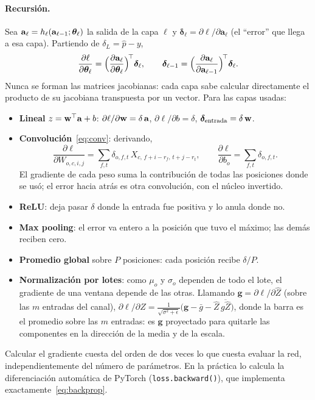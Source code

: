 \paragraph{Recursión.} Sea $\mathbf{a}_\ell = h_\ell(\mathbf{a}_{\ell-1}; \boldsymbol{\theta}_\ell)$ la salida de la capa $\ell$ y
$\boldsymbol\delta_\ell = \partial\ell/\partial\mathbf{a}_\ell$ (el ``error'' que llega a esa capa). Partiendo de
$\delta_L = \hat p - y$,
\begin{equation}
  \frac{\partial\ell}{\partial\boldsymbol{\theta}_\ell} = \Big(\frac{\partial\mathbf{a}_\ell}{\partial\boldsymbol{\theta}_\ell}\Big)^{\!\top}\boldsymbol\delta_\ell,
  \qquad
  \boldsymbol\delta_{\ell-1} = \Big(\frac{\partial\mathbf{a}_\ell}{\partial\mathbf{a}_{\ell-1}}\Big)^{\!\top}\boldsymbol\delta_\ell.
  \label{eq:backprop}
\end{equation}
Nunca se forman las matrices jacobianas: cada capa sabe calcular directamente el producto de su jacobiana transpuesta por un
vector. Para las capas usadas:
\begin{itemize}
  \item \textbf{Lineal} $z = \mathbf{w}^\top\mathbf{a} + b$: $\partial\ell/\partial\mathbf{w} = \delta\,\mathbf{a}$, $\partial\ell/\partial b = \delta$,
        $\boldsymbol\delta_\text{entrada} = \delta\,\mathbf{w}$.
  \item \textbf{Convolución}~\eqref{eq:conv}: derivando,
        \[
          \frac{\partial\ell}{\partial W_{o,c,i,j}} = \sum_{f,t}\delta_{o,f,t}\,X_{c,\,f+i-r_f,\,t+j-r_t},
          \qquad
          \frac{\partial\ell}{\partial b_o} = \sum_{f,t}\delta_{o,f,t}.
        \]
        El gradiente de cada peso suma la contribución de todas las posiciones donde se usó; el error hacia atrás es
        otra convolución, con el núcleo invertido.
  \item \textbf{ReLU}: deja pasar $\delta$ donde la entrada fue positiva y lo anula donde no.
  \item \textbf{Max pooling}: el error va entero a la posición que tuvo el máximo; las demás reciben cero.
  \item \textbf{Promedio global} sobre $P$ posiciones: cada posición recibe $\delta/P$.
  \item \textbf{Normalización por lotes}: como $\mu_o$ y $\sigma_o$ dependen de todo el lote, el gradiente de una ventana
        depende de las otras. Llamando $\mathbf{g} = \partial\ell/\partial\hat Z$ (sobre las $m$ entradas del canal),
        $\partial\ell/\partial Z = \frac{1}{\sqrt{\sigma^2 + \epsilon}}\big(\mathbf{g} - \bar g - \hat Z\,\overline{g\hat Z}\big)$,
        donde la barra es el promedio sobre las $m$ entradas: es $\mathbf{g}$ proyectado para quitarle las componentes en la
        dirección de la media y de la escala.
\end{itemize}
Calcular el gradiente cuesta del orden de dos veces lo que cuesta evaluar la red, independientemente del número de
parámetros. En la práctica lo calcula la diferenciación automática de PyTorch (\texttt{loss.backward()}), que implementa
exactamente~\eqref{eq:backprop}.

